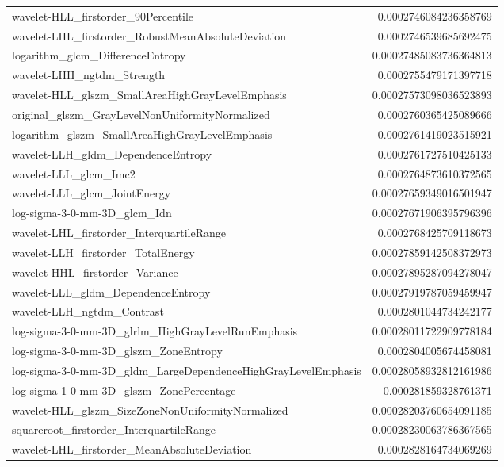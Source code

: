 {\begin{xltabular}[H]{\textwidth}{X r}
        wavelet-HLL\_firstorder\_90Percentile & 0.0002746084236358769 \\
        wavelet-LHL\_firstorder\_RobustMeanAbsoluteDeviation & 0.0002746539685692475 \\
        logarithm\_glcm\_DifferenceEntropy & 0.00027485083736364813 \\
        wavelet-LHH\_ngtdm\_Strength & 0.0002755479171397718 \\
        wavelet-HLL\_glszm\_SmallAreaHighGrayLevelEmphasis & 0.00027573098036523893 \\
        original\_glszm\_GrayLevelNonUniformityNormalized & 0.0002760365425089666 \\
        logarithm\_glszm\_SmallAreaHighGrayLevelEmphasis & 0.0002761419023515921 \\
        wavelet-LLH\_gldm\_DependenceEntropy & 0.0002761727510425133 \\
        wavelet-LLL\_glcm\_Imc2 & 0.0002764873610372565 \\
        wavelet-LLL\_glcm\_JointEnergy & 0.00027659349016501947 \\
        log-sigma-3-0-mm-3D\_glcm\_Idn & 0.00027671906395796396 \\
        wavelet-LHL\_firstorder\_InterquartileRange & 0.0002768425709118673 \\
        wavelet-LLH\_firstorder\_TotalEnergy & 0.00027859142508372973 \\
        wavelet-HHL\_firstorder\_Variance & 0.00027895287094278047 \\
        wavelet-LLL\_gldm\_DependenceEntropy & 0.00027919787059459947 \\
        wavelet-LLH\_ngtdm\_Contrast & 0.0002801044734242177 \\
        log-sigma-3-0-mm-3D\_glrlm\_HighGrayLevelRunEmphasis & 0.00028011722909778184 \\
        log-sigma-3-0-mm-3D\_glszm\_ZoneEntropy & 0.0002804005674458081 \\
        log-sigma-3-0-mm-3D\_gldm\_LargeDependenceHighGrayLevelEmphasis & 0.00028058932812161986 \\
        log-sigma-1-0-mm-3D\_glszm\_ZonePercentage & 0.000281859328761371 \\
        wavelet-HLL\_glszm\_SizeZoneNonUniformityNormalized & 0.00028203760654091185 \\
        squareroot\_firstorder\_InterquartileRange & 0.00028230063786367565 \\
        wavelet-LHL\_firstorder\_MeanAbsoluteDeviation & 0.0002828164734069269 \\

\end{xltabular}}
